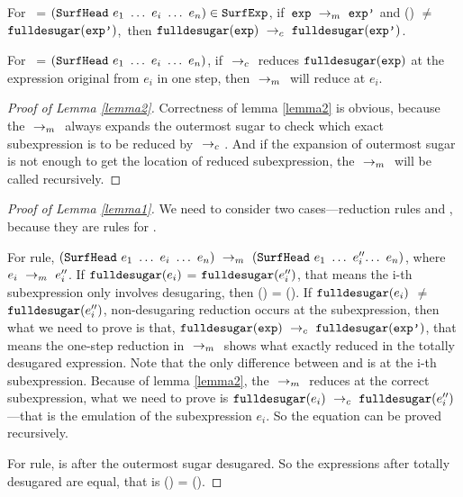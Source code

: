 \begin{lemma}[Emulation]
\label{lemma1}
For~ = $(\mbox{\tt SurfHead}~e_1~\ldots~e_i~\ldots~e_n)\in\mbox{\tt SurfExp}$, if~$\mbox{\tt exp} ~\rightarrow_m~\mbox{\tt exp'}$ and () $\not=$ $\mbox{\tt fulldesugar}(\mbox{\tt exp'})$,~then $\mbox{\tt fulldesugar}(\mbox{\tt exp}) ~\rightarrow_c~\mbox{\tt fulldesugar}(\mbox{\tt exp'})$.

\end{lemma}

\begin{lemma}
\label{lemma2}

For~ = $(\mbox{\tt SurfHead}~e_1~\ldots~e_i~\ldots~e_n)$, if $~\rightarrow_c~$ reduces $\mbox{\tt fulldesugar}(\mbox{\tt exp})$ at the expression original from $e_i$ in one step, then $~\rightarrow_m~$ will reduce  at $e_i$.

\end{lemma}

\begin{proof}[Proof of Lemma \ref{lemma2}]

Correctness of lemma \ref{lemma2} is obvious, because the $~\rightarrow_m~$ always expands the outermost sugar to check which exact subexpression is to be reduced by $~\rightarrow_c~$. And if the expansion of outermost sugar is not enough to get the location of reduced subexpression, the $~\rightarrow_m~$ will be called recursively.
\end{proof}
\begin{proof}[Proof of Lemma \ref{lemma1}]
We need to consider two cases---reduction rules  and , because they are rules for .

For  rule, $\redm{(\m{SurfHead}~e_1~\ldots~e_i~\ldots~e_n)}{(\m{SurfHead}~e_1~\ldots~e_i''$$\ldots~e_n)}$, where $e_i ~\rightarrow_m~e_i''$. 
If $\mbox{\tt fulldesugar}(e_i)$ = $\mbox{\tt fulldesugar}(e_i'')$, that means the i-th subexpression only involves desugaring, then () = (). If $\mbox{\tt fulldesugar}(e_i)$ $\not=$ $\mbox{\tt fulldesugar}(e_i'')$, non-desugaring reduction occurs at the subexpression, then what we need to prove is that, $\mbox{\tt fulldesugar}(\mbox{\tt exp}) ~\rightarrow_c~\mbox{\tt fulldesugar}(\mbox{\tt exp'})$, that means the one-step reduction in $~\rightarrow_m~$ shows what exactly reduced in the totally desugared expression. Note that the only difference between  and  is at the i-th subexpression. Because of lemma \ref{lemma2}, the $~\rightarrow_m~$ reduces  at the correct subexpression, what we need to prove is $\mbox{\tt fulldesugar}(e_i) ~\rightarrow_c~\mbox{\tt fulldesugar}(e_i'')$---that is the emulation of the subexpression $e_i$. So the equation can be proved recursively.

For  rule,  is  after the outermost sugar desugared. So the expressions after totally desugared are equal, that is () =
().
\end{proof}

